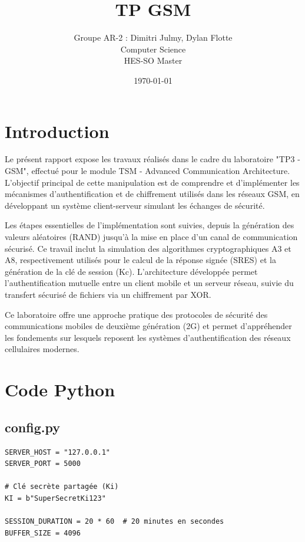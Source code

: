 \documentclass[12pt,a4paper]{report}
\title{
    \vspace{2cm}
    \textbf{\Huge TP GSM} \\
    \vspace{0.5cm}
}
\author{
    Groupe AR-2 : Dimitri Julmy, Dylan Flotte\\
    Computer Science\\
    HES-SO Master
}
\date{\today}
\begin{document}
\maketitle
\thispagestyle{empty}
\newpage

\tableofcontents
\newpage

\chapter*{Introduction}

Le présent rapport expose les travaux réalisés dans le cadre du laboratoire "TP3 - GSM", effectué pour le module TSM - Advanced Communication Architecture. L'objectif principal de cette manipulation est de comprendre et d'implémenter les mécanismes d'authentification et de chiffrement utilisés dans les réseaux GSM, en développant un système client-serveur simulant les échanges de sécurité.

Les étapes essentielles de l'implémentation sont suivies, depuis la génération des valeurs aléatoires (RAND) jusqu'à la mise en place d'un canal de communication sécurisé. Ce travail inclut la simulation des algorithmes cryptographiques A3 et A8, respectivement utilisés pour le calcul de la réponse signée (SRES) et la génération de la clé de session (Kc). L'architecture développée permet l'authentification mutuelle entre un client mobile et un serveur réseau, suivie du transfert sécurisé de fichiers via un chiffrement par XOR.

Ce laboratoire offre une approche pratique des protocoles de sécurité des communications mobiles de deuxième génération (2G) et permet d'appréhender les fondements sur lesquels reposent les systèmes d'authentification des réseaux cellulaires modernes.

\chapter{Code Python}

\section{config.py}
\begin{verbatim}
SERVER_HOST = "127.0.0.1"
SERVER_PORT = 5000

# Clé secrète partagée (Ki)
KI = b"SuperSecretKi123"

SESSION_DURATION = 20 * 60  # 20 minutes en secondes
BUFFER_SIZE = 4096
\end{verbatim}
\end{document}
